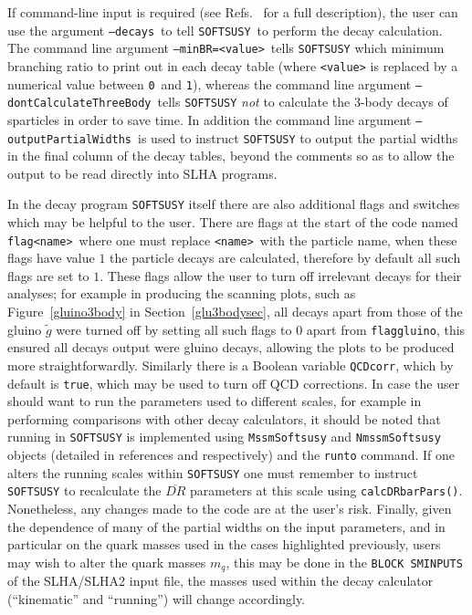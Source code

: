 \documentclass[final,3p,times,pdflatex]{elsarticle}
\def\SOFTSUSY{{\tt SOFTSUSY}}
\def\code#1{{\tt #1}}
\begin{document}
If command-line input is required (see
Refs.~\cite{Allanach:2001kg,Allanach:2013kza} 
for a full description), the user can use the argument 
\code{--decays}~to tell \SOFTSUSY~to perform the decay calculation. 
The command line argument \code{--minBR=<value>}~tells {\tt SOFTSUSY} which minimum
branching ratio to print out in each decay table (where \code{<value>} is
replaced by a numerical value between \code{0}~and \code{1}), whereas the
command line argument \code{--dontCalculateThreeBody}~tells {\tt SOFTSUSY} {\em
  not}\/ to calculate the 3-body decays of sparticles in order to save time. 
In addition the command line argument \code{--outputPartialWidths}~is used 
to instruct {\tt SOFTSUSY} to output the partial widths in the final column of
the decay tables, beyond the comments so as to allow the output to be read
directly into SLHA programs.

In the decay program {\tt SOFTSUSY} itself there are also additional flags and switches
which may be helpful to the user. There are flags at the start of the code named 
\code{flag<name>}~where one must replace \code{<name>}~with the particle name, when
these flags have value $1$ the particle decays are calculated, therefore by default
all such flags are set to $1$. These flags allow the user to turn off irrelevant
decays for their analyses; for example in producing the scanning plots, such as
Figure~\ref{gluino3body} in Section~\ref{glu3bodysec}, all decays apart from those of the
gluino $\tilde{g}$ were turned off by setting all such flags to $0$ apart from
{\tt flaggluino}, this ensured all decays output were gluino decays, allowing the
plots to be produced more straightforwardly. Similarly there is a Boolean variable
{\tt QCDcorr}, which by default is {\tt true}, which may be used to turn off QCD
corrections. In case the user should want to run the parameters used to different
scales, for example in performing comparisons with other decay calculators, it
should be noted that running in {\tt SOFTSUSY} is implemented using {\tt MssmSoftsusy}
and {\tt NmssmSoftsusy} objects (detailed in references \cite{Allanach:2001kg} and
\cite{Allanach:2013kza} respectively) and the {\tt runto} command. If one alters the
running scales within {\tt SOFTSUSY} one must remember to instruct {\tt SOFTSUSY}
to recalculate the $\overline{DR}$ parameters at this scale using {\tt calcDRbarPars()}.
Nonetheless, any changes made to the code are at the user's risk. Finally, given the
dependence of many of the partial widths on the input parameters, and in particular
on the quark masses used in the cases highlighted previously, users may wish to 
alter the quark masses $m_q$, this may be done in the {\tt BLOCK SMINPUTS} of the
SLHA/SLHA2 input file, the masses used within the decay calculator (``kinematic''
and ``running'') will change accordingly.
\end{document}
